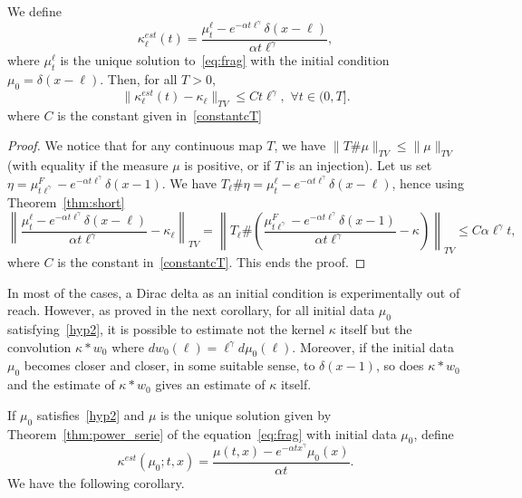 \documentclass[AHL,Unicode,longabstracts,published]{cedram}
\renewcommand*\a{\alpha}
\let\oldforall\forall
\renewcommand*{\forall}{\mathrel{\oldforall}}
\begin{document}
\begin{coro}[An estimate for $\kappa$ using short-time measurements of the particles size distribution when initial condition is a delta function at $x=\ell$]\label{cor:rescaling}
We define
\begin{equation*}
\kappa_{\ell}^{est}(t)= \dfrac{\mu_t^{\ell} - e^{-\a t\ell^{\gamma}} \delta(x-\ell) }{\a t \ell^{\gamma}},
\end{equation*}
where $\mu_t^{\ell}$ is the unique solution to~\eqref{eq:frag} with the initial condition $\mu_0 = \delta(x-\ell)$. Then, for all $T>0$,
\begin{equation*}
\Big\| \kappa_{\ell}^{est}(t)-\kappa_{\ell}\Big\|_{TV} \leq C t \ell^{\gamma},\,\,\forall t\in (0, T].
\end{equation*}
where $C$ is the constant given in~\eqref{constantcT}
\end{coro}

\begin{proof}
We notice that for any continuous map $T$, we have $\|T\# \mu\|_{TV} \leq \|\mu\|_{TV} $ (with equality if the measure $\mu$ is positive, or if $T$ is an injection). Let us set $\eta= \mu_{t\ell^{\gamma}}^{F} - e^{-\a t\ell^{\gamma}} \delta(x-1) $. We have $T_{\ell} \#\eta=\mu_t^{\ell}-e^{-\a t\ell^{\gamma}} \delta(x-\ell) $, hence using Theorem~\ref{thm:short}
\begin{equation*}
\left\|\dfrac{\mu_t^{\ell} - e^{-\a t\ell^{\gamma}} \delta(x-\ell) }{\a t \ell^{\gamma}}-\kappa_{\ell}\right\|_{TV} = \left\| T_{\ell} \# \left(\dfrac{\mu_{t\ell^{\gamma}}^{F} - e^{-\a t\ell^{\gamma}} \delta(x-1) }{\a t \ell^{\gamma}}-\kappa\right)\right\|_{TV} \leq C \a \ell^{\gamma} t,
\end{equation*}
where $C$ is the constant in~\eqref{constantcT}. This ends the proof.
\end{proof}

In most of the cases, a Dirac delta as an initial condition is experimentally out of reach. However, as proved in the next corollary, for all initial data $\mu _0$ satisfying~\eqref{hyp2}, it is possible to estimate not the kernel $\kappa$ itself but the convolution $\kappa \ast w _0$ where $dw_0(\ell)=\ell^\gamma d\mu _0(\ell)$. Moreover, if the initial data $\mu _0$ becomes closer and closer, in some suitable sense, to $\delta (x-1)$, so does $\kappa \ast w _0$ and the estimate of $\kappa \ast w_0$ gives an estimate of $\kappa $ itself.

If $\mu _0$ satisfies~\eqref{hyp2} and $\mu $ is the unique solution given by Theorem~\ref{thm:power_serie} of the equation~\eqref{eq:frag} with initial data $\mu _0$, define
\begin{equation}\label{def:kappaestmu0}
\kappa^{est}(\mu _0; t, x)=\dfrac{\mu (t,x) - e^{-\a tx^{\gamma}}\mu _0(x)}{\a t}.
\end{equation}
We have the following corollary.
\end{document}
